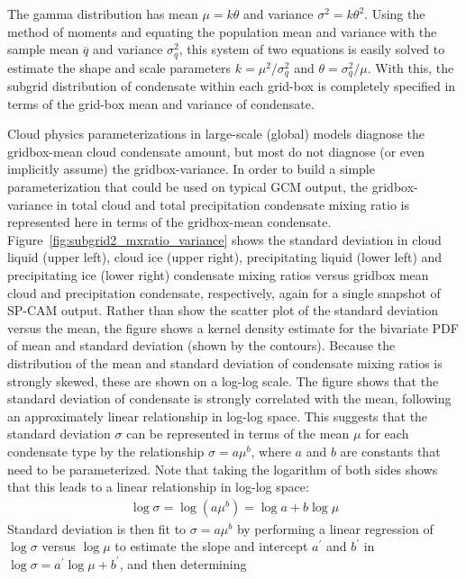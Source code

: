 The gamma distribution has mean \(\mu = k\theta\) and variance
\(\sigma^2 = k \theta^2\). Using the method of moments
\citep[e.g.;][]{wilks_2011} and equating the population mean and
variance with the sample mean \(\overline{q}\) and variance
\(\sigma_q^2\), this system of two equations is easily solved to
estimate the shape and scale parameters \(k = \mu^2 / \sigma_q^2\) and
\(\theta = \sigma_q^2 / \mu\). With this, the subgrid distribution of
condensate within each grid-box is completely specified in terms of the
grid-box mean and variance of condensate.

Cloud physics parameterizations in large-scale (global) models diagnose
the gridbox-mean cloud condensate amount, but most do not diagnose (or
even implicitly assume) the gridbox-variance. In order to build a simple
parameterization that could be used on typical GCM output, the
gridbox-variance in total cloud and total precipitation condensate
mixing ratio is represented here in terms of the gridbox-mean
condensate. Figure~\ref{fig:subgrid2_mxratio_variance} shows the
standard deviation in cloud liquid (upper left), cloud ice (upper
right), precipitating liquid (lower left) and precipitating ice (lower
right) condensate mixing ratios versus gridbox mean cloud and
precipitation condensate, respectively, again for a single snapshot of
SP-CAM output. Rather than show the scatter plot of the standard
deviation versus the mean, the figure shows a kernel density estimate
for the bivariate PDF of mean and standard deviation (shown by the
contours). Because the distribution of the mean and standard deviation
of condensate mixing ratios is strongly skewed, these are shown on a
log-log scale. The figure shows that the standard deviation of
condensate is strongly correlated with the mean, following an
approximately linear relationship in log-log space. This suggests that
the standard deviation \(\sigma\) can be represented in terms of the
mean \(\mu\) for each condensate type by the relationship
\(\sigma = a \mu^b\), where \(a\) and \(b\) are constants that need to
be parameterized. Note that taking the logarithm of both sides shows
that this leads to a linear relationship in log-log space:
\[\begin{gathered}
\log \sigma = \log(a \mu^b) = \log a + b\log \mu\end{gathered}\]
Standard deviation is then fit to \(\sigma = a \mu^b\) by performing a
linear regression of \(\log\sigma\) versus \(\log \mu\) to estimate the
slope and intercept \(a^{\prime}\) and \(b^{\prime}\) in
\(\log \sigma = a^{\prime} \log \mu + b^{\prime}\), and then determining
